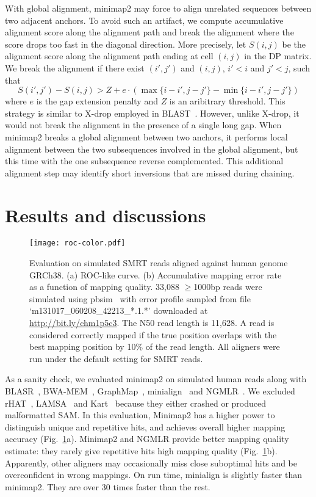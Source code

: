\documentclass{bioinfo}
\begin{document}
\begin{methods}
With global alignment, minimap2 may force to align unrelated sequences between
two adjacent anchors. To avoid such an artifact, we compute accumulative
alignment score along the alignment path and break the alignment where the
score drops too fast in the diagonal direction. More precisely, let $S(i,j)$ be
the alignment score along the alignment path ending at cell $(i,j)$ in the DP
matrix. We break the alignment if there exist $(i',j')$ and $(i,j)$, $i'<i$ and
$j'<j$, such that
\[
S(i',j')-S(i,j)>Z+e\cdot(\max\{i-i',j-j'\}-\min\{i-i',j-j'\})
\]
where $e$ is the gap extension penalty and $Z$ is an aribitrary threshold.
This strategy is similar to X-drop employed in BLAST~\citep{Altschul:1997vn}.
However, unlike X-drop, it would not break the alignment in the presence of a
single long gap. When minimap2 breaks a global alignment between two anchors,
it performs local alignment between the two subsequences involved in the global
alignment, but this time with the one subsequence reverse complemented. This
additional alignment step may identify short inversions that are missed during
chaining.

\end{methods}

\section{Results and discussions}
\begin{figure}[!tb]
\centering
\texttt{[image: roc-color.pdf]}
\caption{Evaluation on simulated SMRT reads aligned against human genome
GRCh38. (a) ROC-like curve. (b) Accumulative mapping error rate as a function
of mapping quality. 33,088 $\ge$1000bp reads were simulated using
pbsim~\citep{Ono:2013aa} with error profile sampled from file
`m131017\_060208\_42213\_*.1.*' downloaded at
\href{http://bit.ly/chm1p5c3}{http://bit.ly/chm1p5c3}. The N50 read length is
11,628. A read is considered correctly mapped if the true position overlaps
with the best mapping position by 10\% of the read length. All aligners were
run under the default setting for SMRT reads.}\label{fig:eval}
\end{figure}

As a sanity check, we evaluated minimap2 on simulated human reads along with
BLASR~\citep{Chaisson:2012aa}, 
BWA-MEM~\citep{Li:2013aa},
GraphMap~\citep{Sovic:2016aa},
minialign~\citep{Suzuki:2016} and
NGMLR~\citep{Sedlazeck169557}. We excluded rHAT~\citep{Liu:2016ab},
LAMSA~\citep{Liu:2017aa} and Kart~\citep{Lin:2017aa} because they either
crashed or produced malformatted SAM.  In this evaluation, Minimap2 has a
higher power to distinguish unique and repetitive hits, and achieves overall
higher mapping accuracy (Fig.~\ref{fig:eval}a). Minimap2 and NGMLR provide
better mapping quality estimate: they rarely give repetitive hits high mapping
quality (Fig.~\ref{fig:eval}b).  Apparently, other aligners may occasionally
miss close suboptimal hits and be overconfident in wrong mappings. On run time,
minialign is slightly faster than minimap2. They are over 30 times faster than
the rest.
\end{document}
